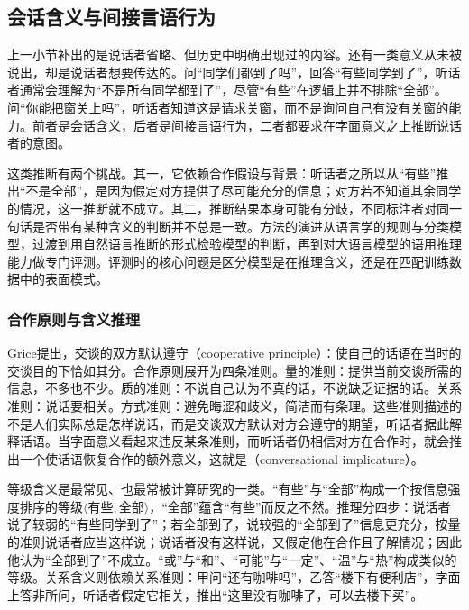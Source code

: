 \subsection{会话含义与间接言语行为}
\label{sec:nlp-analysis-implicature}

上一小节补出的是说话者省略、但历史中明确出现过的内容。还有一类意义从未被说出，却是说话者想要传达的。问“同学们都到了吗”，回答“有些同学到了”，听话者通常会理解为“不是所有同学都到了”，尽管“有些”在逻辑上并不排除“全部”。问“你能把窗关上吗”，听话者知道这是请求关窗，而不是询问自己有没有关窗的能力。前者是会话含义，后者是间接言语行为，二者都要求在字面意义之上推断说话者的意图。

这类推断有两个挑战。其一，它依赖合作假设与背景：听话者之所以从“有些”推出“不是全部”，是因为假定对方提供了尽可能充分的信息；对方若不知道其余同学的情况，这一推断就不成立。其二，推断结果本身可能有分歧，不同标注者对同一句话是否带有某种含义的判断并不总是一致。方法的演进从语言学的规则与分类模型，过渡到用自然语言推断的形式检验模型的判断，再到对大语言模型的语用推理能力做专门评测。评测时的核心问题是区分模型是在推理含义，还是在匹配训练数据中的表面模式。

\subsubsection{合作原则与含义推理}
\label{sec:nlp-analysis-grice}

Grice提出，交谈的双方默认遵守（cooperative principle）：使自己的话语在当时的交谈目的下恰如其分。合作原则展开为四条准则。量的准则：提供当前交谈所需的信息，不多也不少。质的准则：不说自己认为不真的话，不说缺乏证据的话。关系准则：说话要相关。方式准则：避免晦涩和歧义，简洁而有条理。这些准则描述的不是人们实际总是怎样说话，而是交谈双方默认对方会遵守的期望，听话者据此解释话语。当字面意义看起来违反某条准则，而听话者仍相信对方在合作时，就会推出一个使话语恢复合作的额外意义，这就是（conversational implicature）。

等级含义是最常见、也最常被计算研究的一类。“有些”与“全部”构成一个按信息强度排序的等级$\langle\text{有些},\text{全部}\rangle$，“全部”蕴含“有些”而反之不然。推理分四步：说话者说了较弱的“有些同学到了”；若全部到了，说较强的“全部到了”信息更充分，按量的准则说话者应当这样说；说话者没有这样说，又假定他在合作且了解情况；因此他认为“全部到了”不成立。“或”与“和”、“可能”与“一定”、“温”与“热”构成类似的等级。关系含义则依赖关系准则：甲问“还有咖啡吗”，乙答“楼下有便利店”，字面上答非所问，听话者假定它相关，推出“这里没有咖啡了，可以去楼下买”。

